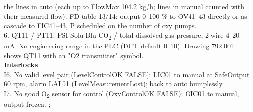 {{       the lines in auto (each up to FlowMax 104.2 kg/h; lines in manual counted with their measured flow).
       \textcolor{pidcheck}{FD table 13/14: output 0--100 \% to OV41--43 directly or as cascade to FIC41--43,
       P scheduled on the number of oxy pumps.}\\[0.8mm]
    6. QT11 / PT11: PSI Solu-Blu CO\textsubscript{2} / total dissolved gas pressure, 2-wire 4--20 mA.
       \textcolor{pidcheck}{No engineering range in the PLC (DUT default 0--10). Drawing 792.001 shows QT11 with an
       "O2 transmitter" symbol.}\\[1.5mm]
    \textbf{Interlocks}\\[1mm]
    I6. No valid level pair (LevelControlOK FALSE): LIC01 to manual at SafeOutput 60 rpm, alarm LAL01
        (LevelMeasurementLost); back to auto bumplessly.\\[0.8mm]
    I7. No good O\textsubscript{2} sensor for control (OxyControlOK FALSE): OIC01 to manual, output frozen.
  };
}
